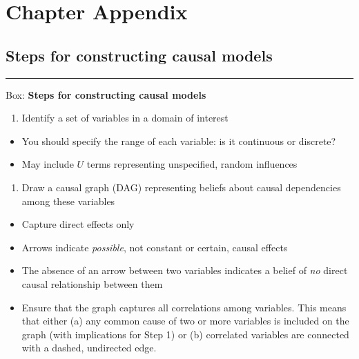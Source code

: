\documentclass[
  12pt,
]{book}
\providecommand{\tightlist}{%
  \setlength{\itemsep}{0pt}\setlength{\parskip}{0pt}}
\begin{document}
\hypertarget{chapter-appendix}{%
\section{Chapter Appendix}\label{chapter-appendix}}

\hypertarget{steps-for-constructing-causal-models}{%
\subsection{Steps for constructing causal models}\label{steps-for-constructing-causal-models}}

\begin{center}\rule{0.5\linewidth}{0.5pt}\end{center}

Box: \textbf{Steps for constructing causal models}

\begin{enumerate}
\def\labelenumi{\arabic{enumi}.}
\tightlist
\item
  Identify a set of variables in a domain of interest
\end{enumerate}

\begin{itemize}
\tightlist
\item
  You should specify the range of each variable: is it continuous or discrete?
\item
  May include \(U\) terms representing unspecified, random influences
\end{itemize}

\begin{enumerate}
\def\labelenumi{\arabic{enumi}.}
\setcounter{enumi}{1}
\tightlist
\item
  Draw a causal graph (DAG) representing beliefs about causal dependencies among these variables
\end{enumerate}

\begin{itemize}
\tightlist
\item
  Capture direct effects only
\item
  Arrows indicate \emph{possible}, not constant or certain, causal effects
\item
  The absence of an arrow between two variables indicates a belief of \emph{no} direct causal relationship between them
\item
  Ensure that the graph captures all correlations among variables. This means that either (a) any common cause of two or more variables is included on the graph (with implications for Step 1) or (b) correlated variables are connected with a dashed, undirected edge.
\end{itemize}
\end{document}
